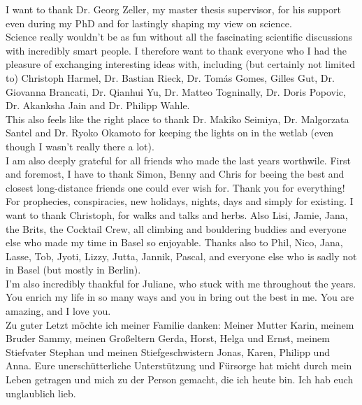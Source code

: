I want to thank Dr. Georg Zeller, my master thesis supervisor, for his support even during my PhD and for lastingly shaping my view on science. \\

Science really wouldn't be as fun without all the fascinating scientific discussions with incredibly smart people. I therefore want to thank everyone who I had the pleasure of exchanging interesting ideas with, including (but certainly not limited to) Christoph Harmel, Dr. Bastian Rieck, Dr. Tomás Gomes, Gilles Gut, Dr. Giovanna Brancati, Dr. Qianhui Yu, Dr. Matteo Togninally, Dr. Doris Popovic, Dr. Akanksha Jain and Dr. Philipp Wahle. \\

This also feels like the right place to thank Dr. Makiko Seimiya, Dr. Malgorzata Santel and Dr. Ryoko Okamoto for keeping the lights on in the wetlab (even though I wasn't really there a lot). \\

I am also deeply grateful for all friends who made the last years worthwile. First and foremost, I have to thank Simon, Benny and Chris for beeing the best and closest long-distance friends one could ever wish for. Thank you for everything! For prophecies, conspiracies, new holidays, nights, days and simply for existing. I want to thank  Christoph, for walks and talks and herbs. Also Lisi, Jamie, Jana, the Brits, the Cocktail Crew, all climbing and bouldering buddies and everyone else who made my time in Basel so enjoyable. Thanks also to Phil, Nico, Jana, Lasse, Tob, Jyoti, Lizzy, Jutta, Jannik, Pascal, and everyone else who is sadly not in Basel (but mostly in Berlin). \\

I'm also incredibly thankful for Juliane, who stuck with me throughout the years. You enrich my life in so many ways and you in bring out the best in me. You are amazing, and I love you. \\

Zu guter Letzt möchte ich meiner Familie danken: Meiner Mutter Karin, meinem Bruder Sammy, meinen Großeltern Gerda, Horst, Helga und Ernst, meinem Stiefvater Stephan und meinen Stiefgeschwistern Jonas, Karen, Philipp und Anna. Eure unerschütterliche Unterstützung und Fürsorge hat micht durch mein Leben getragen und mich zu der Person gemacht, die ich heute bin. Ich hab euch unglaublich lieb. 




